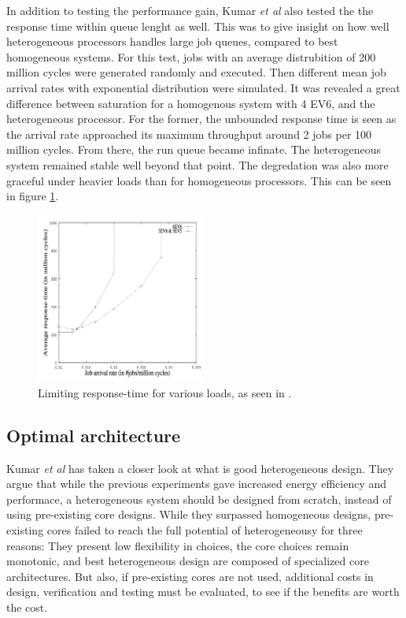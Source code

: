 In addition to testing the performance gain, Kumar \textit{et al} also tested the the response time within queue lenght as well.
This was to give insight on how well heterogeneous processors handles large job queues, compared to best homogeneous systems.
For this test, jobs with an average distrubition of 200 million cycles were generated randomly and executed.
Then different mean job arrival rates with exponential distribution were simulated.
It was revealed a great difference between saturation for a homogenous system with 4 EV6, and the heterogeneous processor.
For the former, the unbounded response time is seen as the arrival rate approached its maximum throughput around 2 jobs per 100 million cycles.
From there, the run queue became infinate.
The heterogeneous system remained stable well beyond that point.
The degredation was also more graceful under heavier loads than for homogeneous processors.
This can be seen in figure \ref{fig:Kumar3}.

\begin{figure}[htb]
    \centering
    \includegraphics[width=0.5\textwidth]{Figures/Heterogeneous/Kumar3}
    \caption{Limiting response-time for various loads, as seen in \cite{heterogeneous-perf}.}
    \label{fig:Kumar3}
\end{figure}

\subsection{Optimal architecture}
\label{subsec:rw_arch}
Kumar \textit{et al}\cite{heterogeneous-arch} has taken a closer look at what is good heterogeneous design.
They argue that while the previous experiments gave increased energy efficiency and performace, a heterogeneous system should be designed from scratch, instead of using pre-existing core designs.
While they surpassed homogeneous designs, pre-existing cores failed to reach the full potential of heterogeneousy for three reasons: They present low flexibility in choices, the core choices remain monotonic, and best heterogeneous design are composed of specialized core architectures\cite{heterogeneous-arch}.
But also, if pre-existing cores are not used, additional costs in design, verification and testing must be evaluated, to see if the benefits are worth the cost.


